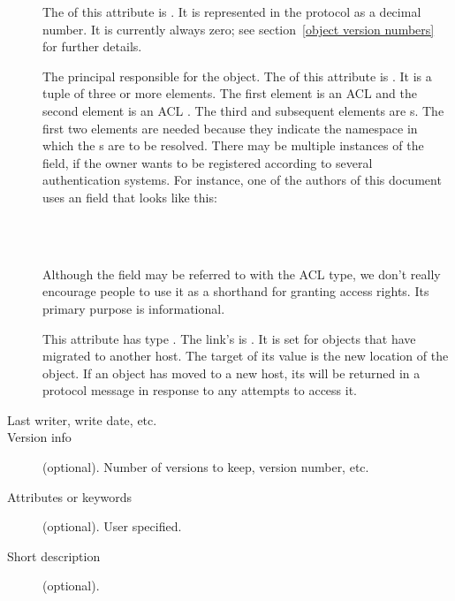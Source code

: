 \begin{description}
\item[] The  of this
attribute is .  It is represented in the protocol as a
decimal number.  It is currently always zero; see section~\ref{object
version numbers} for further details.

\item[] The principal responsible for the object.  The
 of this attribute is .  It is a tuple
of three or more elements.  The first element is an ACL
 and the second element is an ACL
.  The third and subsequent elements are
s.  The first two elements are needed because
they indicate the namespace in which the s are to
be resolved.  There may be multiple instances of the 
field, if the owner wants to be registered according to several
authentication systems.  For instance, one of the authors of this
document uses an  field that looks like this:
\begin{command}
 \\
 \\
\end{command}
Although the  field may be referred to with the 
ACL type, we don't really encourage people to use it as a shorthand
for granting access rights.  Its primary purpose is informational.

\item[]  This attribute has type .
The link's  is .   It is set for objects that
have migrated to another host.  The target of its value is the new
location of the object.  If an object has moved to a new host,
its  will be returned in a 
protocol message in response to any attempts to access it.

\item[Last writer, write date, etc.] 

\item[Version info] (optional).  Number of versions to keep,
version number, etc. 

\item[Attributes or keywords] (optional).  User specified.

\item[Short description] (optional). 


\end{description}
